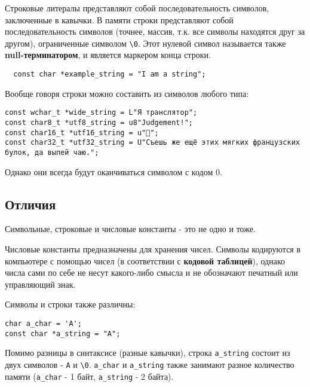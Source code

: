 Строковые литералы представляют собой последовательность символов,
заключенные в кавычки. В памяти строки представляют собой
последовательность символов (точнее, массив, т.к. все символы находятся
друг за другом), ограниченные символом \texttt{\textbackslash{}0}. Этот
нулевой символ называется также \textbf{null-терминатором}, и является
маркером конца строки.

\begin{verbatim}
  const char *example_string = "I am a string";
\end{verbatim}
Вообще говоря строки можно составить из символов любого типа:

\begin{verbatim}
const wchar_t *wide_string = L"Я транслятор";
const char8_t *utf8_string = u8"Judgement!";
const char16_t *utf16_string = u"🐂";
const char32_t *utf32_string = U"Съешь же ещё этих мягких французских булок, да выпей чаю.";
\end{verbatim}

Однако они всегда будут оканчиваться символом с кодом 0.

\subsection{Отличия}\label{ux43eux442ux43bux438ux447ux438ux44f}

Символьные, строковые и числовые константы - это не одно и тоже.

Числовые константы предназначены для хранения чисел. Символы кодируются
в компьютере с помощью чисел (в соответствии с \textbf{кодовой
таблицей}), однако числа сами по себе не несут какого-либо смысла и не
обозначают печатный или управляющий знак.

Символы и строки также различны:

\begin{verbatim}
char a_char = 'A';
const char *a_string = "A";
\end{verbatim}

Помимо разницы в синтаксисе (разные кавычки), строка \texttt{a\_string}
состоит из двух символов -
\texttt{\textquotesingle{}A\textquotesingle{}} и
\texttt{\textquotesingle{}\textbackslash{}0\textquotesingle{}}.
\texttt{a\_char} и \texttt{a\_string} также занимают разное количество
памяти (\texttt{a\_char} - 1 байт, \texttt{a\_string} - 2 байта).
